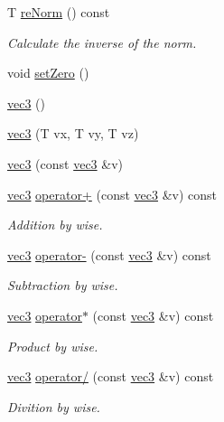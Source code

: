 \begin{DoxyCompactItemize}
\item 
T \mbox{\hyperlink{struct_space_h_1_1vec3_a90d3f8ac98cf17cb20986997daaf9e0e}{re\+Norm}} () const
\begin{DoxyCompactList}\small\item\em Calculate the inverse of the norm. \end{DoxyCompactList}\item 
void \mbox{\hyperlink{struct_space_h_1_1vec3_ad2e7b91b843f84633372857718f1b5ba}{set\+Zero}} ()
\item 
\mbox{\hyperlink{struct_space_h_1_1vec3_adaeadb1aa964e9f603d2d2402bc0e29a}{vec3}} ()
\item 
\mbox{\hyperlink{struct_space_h_1_1vec3_a9441fda82b87e8b91167dc6e5e3039a2}{vec3}} (T vx, T vy, T vz)
\item 
\mbox{\hyperlink{struct_space_h_1_1vec3_ae3f72473af782f642108ed5c87263657}{vec3}} (const \mbox{\hyperlink{struct_space_h_1_1vec3}{vec3}} \&v)
\item 
\mbox{\hyperlink{struct_space_h_1_1vec3}{vec3}} \mbox{\hyperlink{struct_space_h_1_1vec3_a439dd37afaf3c046cd58b370b9d70b80}{operator+}} (const \mbox{\hyperlink{struct_space_h_1_1vec3}{vec3}} \&v) const
\begin{DoxyCompactList}\small\item\em Addition by wise. \end{DoxyCompactList}\item 
\mbox{\hyperlink{struct_space_h_1_1vec3}{vec3}} \mbox{\hyperlink{struct_space_h_1_1vec3_a8af5f368ccbf70d24d528592acfc6278}{operator-\/}} (const \mbox{\hyperlink{struct_space_h_1_1vec3}{vec3}} \&v) const
\begin{DoxyCompactList}\small\item\em Subtraction by wise. \end{DoxyCompactList}\item 
\mbox{\hyperlink{struct_space_h_1_1vec3}{vec3}} \mbox{\hyperlink{struct_space_h_1_1vec3_a5399298171d5e12e7b76ade00ab7d67d}{operator$\ast$}} (const \mbox{\hyperlink{struct_space_h_1_1vec3}{vec3}} \&v) const
\begin{DoxyCompactList}\small\item\em Product by wise. \end{DoxyCompactList}\item 
\mbox{\hyperlink{struct_space_h_1_1vec3}{vec3}} \mbox{\hyperlink{struct_space_h_1_1vec3_ab9d46a10bb578ff6939ed9280cb12df8}{operator/}} (const \mbox{\hyperlink{struct_space_h_1_1vec3}{vec3}} \&v) const
\begin{DoxyCompactList}\small\item\em Divition by wise. \end{DoxyCompactList}\item 

\end{DoxyCompactItemize}

